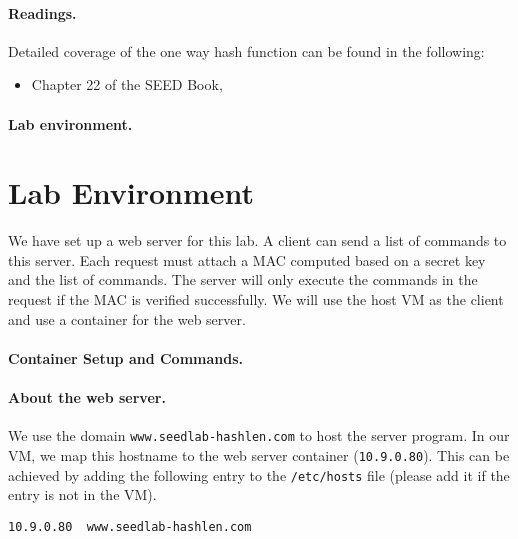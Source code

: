 \paragraph{Readings.} Detailed coverage of the one way hash function can be
found in the following:

\begin{itemize}
\item Chapter 22 of the SEED Book, \seedbook
\end{itemize}


\paragraph{Lab environment.}
\seedenvironmentC




\section{Lab Environment}

We have set up a web server for this lab.
A client can send a list of commands to this server.
Each request must attach a MAC computed based on a secret
key and the list of commands. The server will
only execute the commands in the request if
the MAC is verified successfully.
We will use the host VM as the client and use
a container for the web server.


\paragraph{Container Setup and Commands.}




\paragraph{About the web server.}
We use the domain \texttt{www.seedlab-hashlen.com} to host the server program.
In our VM, we map this hostname to
the web server container (\texttt{10.9.0.80}). This can be
achieved by adding the following entry to the
\texttt{/etc/hosts} file (please add it if the entry is not
in the VM).

\begin{lstlisting}
10.9.0.80  www.seedlab-hashlen.com
\end{lstlisting}


